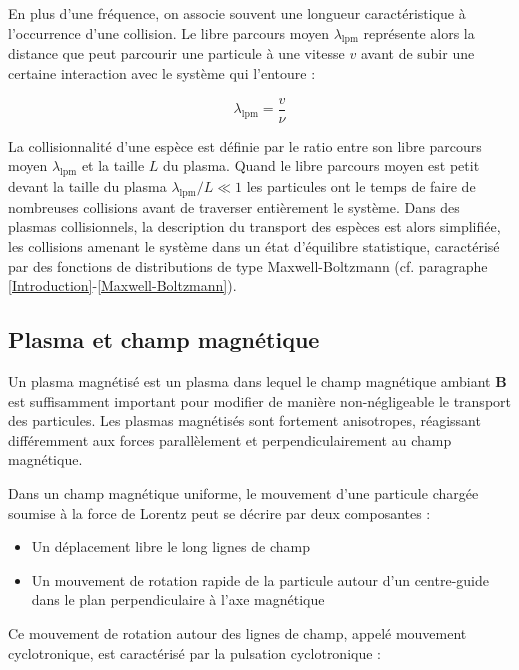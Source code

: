 \begin{refsection}
En plus d'une fréquence, on associe souvent une longueur caractéristique
à l'occurrence d'une collision. Le libre parcours moyen $\lambda_\text{lpm}$
représente alors la distance que peut parcourir une particule à une vitesse
$v$ avant de subir une certaine interaction avec le système qui l'entoure :

\begin{equation}
	\lambda_\text{lpm}=\frac{v}{\nu}
\end{equation} 

La collisionnalité d'une espèce est
définie par le ratio entre son libre parcours moyen $\lambda_\text{lpm}$ et la
taille $L$ du plasma. Quand le libre parcours moyen est petit devant la
taille du plasma $\lambda_\text{lpm}/L\ll 1$
les particules ont le temps de faire de nombreuses collisions avant de
traverser entièrement le système. Dans des plasmas collisionnels, la description
du transport des espèces est alors simplifiée, les collisions amenant le système dans un état
d'équilibre statistique, caractérisé par des fonctions de distributions de
type Maxwell-Boltzmann (cf. paragraphe \ref{Introduction}-\ref{Maxwell-Boltzmann}).


\subsection{Plasma et champ magnétique} 
Un plasma magnétisé est un plasma dans lequel le champ magnétique ambiant
$\mathbf{B}$ est suffisamment important pour modifier de manière non-négligeable
le transport des particules. Les plasmas magnétisés sont fortement
anisotropes, réagissant différemment aux forces parallèlement et
perpendiculairement au champ magnétique.

Dans un champ magnétique uniforme, le mouvement d'une particule chargée
soumise à la force de Lorentz peut se décrire par deux composantes :

\begin{itemize}
  \item Un déplacement libre le long lignes de champ
  \item Un mouvement de rotation rapide de la particule
  autour d'un centre-guide dans le plan perpendiculaire à l'axe magnétique
\end{itemize}

Ce mouvement de rotation autour des lignes de champ, appelé mouvement
cyclotronique, est caractérisé par la pulsation cyclotronique : 


\end{refsection}
